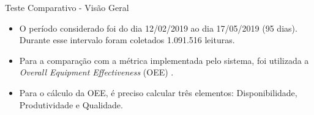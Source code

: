 \documentclass{beamer}
\begin{document}
    \begin{frame}{Teste Comparativo - Visão Geral}
      \begin{itemize}
        \item O período considerado foi do dia 12/02/2019 ao dia 17/05/2019 (95 dias). Durante esse intervalo foram coletados 1.091.516 leituras.
        \item Para a comparação com a métrica implementada pelo sistema, foi utilizada a \textit{Overall Equipment Effectiveness} (OEE) \cite{artigoOEE}.
        \item Para o cálculo da OEE, é preciso calcular três elementos: Disponibilidade, Produtividade e Qualidade.
      \end{itemize}

    \end{frame}
\end{document}
